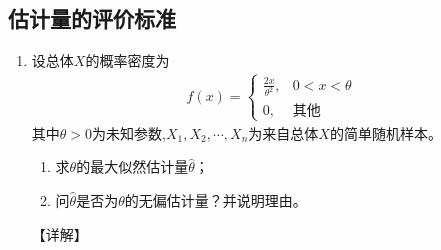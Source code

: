 \documentclass[12pt, a4paper, oneside, UTF8]{ctexbook}
\begin{document}
\subsection{估计量的评价标准}

\begin{enumerate}[label=\arabic*.,start=4]
    \item 设总体$X$的概率密度为
    \begin{align*}
        f(x)=\begin{cases}
            \frac{2x}{\theta^2}, & 0<x<\theta \\
            0, & \text{其他}
        \end{cases}
    \end{align*}
    其中$\theta>0$为未知参数,$X_1,X_2,\cdots,X_n$为来自总体$X$的简单随机样本。
    \begin{enumerate}
        \item 求$\theta$的最大似然估计量$\hat{\theta}$；
        \item 问$\hat{\theta}$是否为$\theta$的无偏估计量？并说明理由。
    \end{enumerate}
    
    \begin{solution}
    【详解】
    \end{solution}
\end{enumerate}

\ifx\allfiles\undefined
\end{document}

